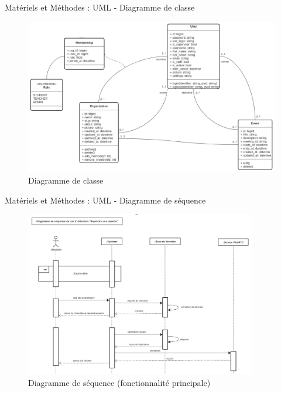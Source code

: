 \documentclass{beamer}
\begin{document}
\begin{frame}{Matériels et Méthodes : \small{UML} - \footnotesize{Diagramme de classe}}
  \begin{figure}[H]
    \centering
    \includegraphics[width=\textwidth]{../../images/class-diag.png}
    \caption{Diagramme de classe}
\end{figure}
\end{frame}

\begin{frame}{Matériels et Méthodes : \small{UML} - \footnotesize{Diagramme de séquence}}
  \begin{figure}[H]
    \centering
    \includegraphics[width=0.9\textwidth]{../../images/join-meet-sequence-diag.png}
    \caption{Diagramme de séquence (fonctionnalité principale)}
\end{figure}
\end{frame}
\end{document}
